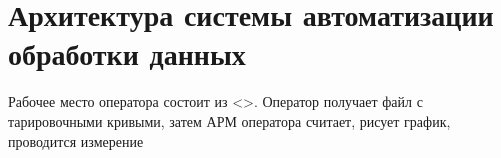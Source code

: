 \section{Архитектура системы автоматизации обработки данных}\label{subsect2_5}

Рабочее место оператора состоит из <>. Оператор получает файл с тарировочными кривыми, затем АРМ оператора считает, рисует график, проводится измерение
\clearpage